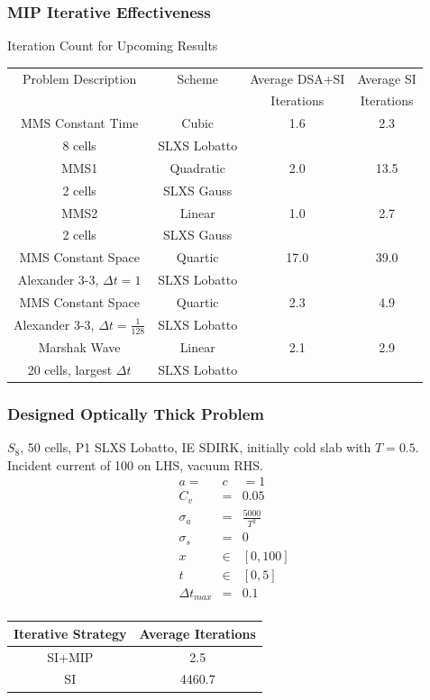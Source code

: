 \documentclass{beamer}
\newcommand{\bea}{\begin{eqnarray*}}  %
\newcommand{\eea}{\end{eqnarray*}}
\begin{document}
\begin{frame}
\frametitle{MIP Iterative Effectiveness}
\centering
Iteration Count for Upcoming Results
\footnotesize
\begin{tabular}{|c|c|c|c|}
\hline
Problem Description & Scheme & Average DSA+SI & Average SI \\
{}									&				 &  Iterations & Iterations  \\
\hline
MMS Constant Time	 & Cubic 			 & 1.6 & 2.3 \\
8 cells 						& SLXS Lobatto & {} & {} \\
\hline
MMS1 						& Quadratic 		& 2.0 & 13.5 \\
2 cells 				& SLXS Gauss 		& {}  & {} \\
\hline
MMS2 						& Linear	 & 1.0 & 2.7 \\
2 cells 					& SLXS Gauss & {} & {} \\
\hline
MMS Constant Space 									& Quartic 				 & 17.0 & 39.0 \\
Alexander 3-3, $\Delta t=1$					& SLXS Lobatto 			& {}  & {} \\
\hline
MMS Constant Space 										& Quartic 				 & 2.3 & 4.9 \\
Alexander 3-3, $\Delta t=\frac{1}{128}$	& SLXS Lobatto 			& {}  & {} \\
\hline
Marshak Wave 									&  Linear			 & 2.1 & 2.9 \\
20 cells, largest $\Delta t$	& SLXS Lobatto & {} 		 & {} \\
\hline
\end{tabular}
\end{frame}

\begin{frame}
\frametitle{Designed Optically Thick Problem}
$S_8$, 50 cells, P1 SLXS Lobatto, IE SDIRK, initially cold slab with $T=0.5$.
Incident current of 100 on LHS, vacuum RHS.
\centering
\bea
a=&c&=1 \\
C_v &=& 0.05\\
\sigma_a& = &\frac{5000}{T^2} \\
\sigma_s &=& 0 \\
x&\in&[0,100]\\ 
t&\in&[0,5] \\ 
\Delta t_{max} &=& 0.1 \\
\eea
\footnotesize
\begin{tabular}{|c|c|}
\hline	
Iterative Strategy		& Average Iterations  \\
\hline
SI+MIP				&   2.5  \\ 
\hline
SI  &   4460.7 \\
\hline
\end{tabular}
%
\end{frame}
\end{document}

